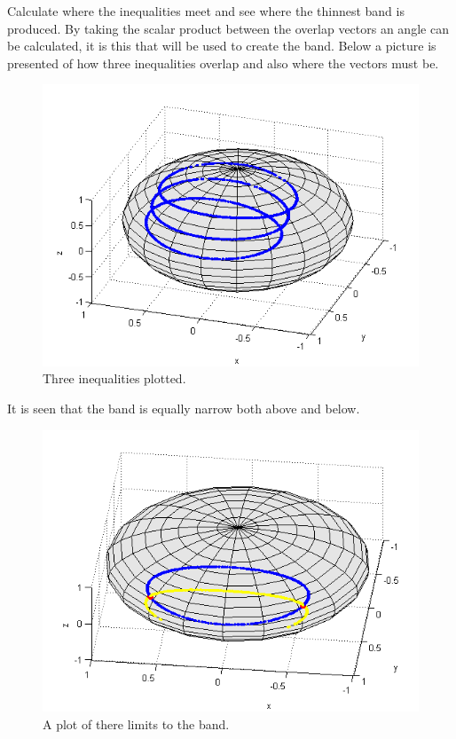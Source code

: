 Calculate where the inequalities meet and see where the thinnest band is produced. By taking the scalar product between the overlap vectors an angle can be calculated, it is  this that will be used to create the band. Below a picture is presented of how three inequalities overlap and also where the vectors must be. 
\begin{figure}[H]
\begin{center}
\includegraphics[scale=0.5]{overlap114.png}
\caption{Three inequalities plotted.}
\label{fig:overlap114}
\end{center}
\end{figure}
It is seen that the band is equally narrow both above and below. 
\begin{figure}[H]
\begin{center}
\includegraphics[scale=0.5]{band.png}
\caption{A plot of there limits to the band.}
\label{fig:band}
\end{center}
\end{figure}
